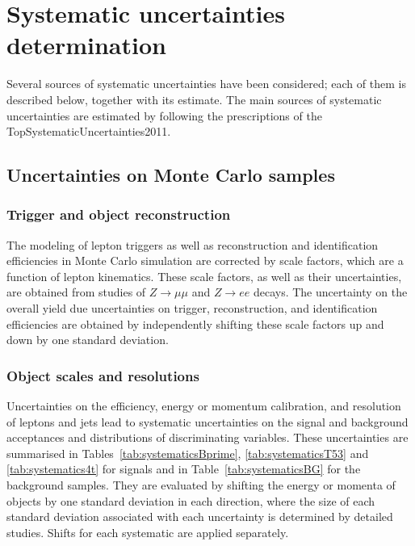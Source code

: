 

\section{Systematic uncertainties determination}  
\label{sec:systematicdetermination}

Several sources of systematic uncertainties have been considered; each of them is described below, together with its estimate. The main sources of systematic uncertainties are estimated
by following the prescriptions of the TopSystematicUncertainties2011.

\subsection{Uncertainties on Monte Carlo samples}

\subsubsection{Trigger and object reconstruction}
The modeling of lepton triggers as well as reconstruction and identification efficiencies in
Monte Carlo simulation are corrected by scale factors, which are a function of lepton kinematics.
These scale factors, as well as their uncertainties, are obtained from studies of $Z \rightarrow \mu \mu$ and $Z \rightarrow e e$ decays.
The uncertainty on the overall yield due uncertainties on trigger, reconstruction, and identification efficiencies 
are obtained by independently shifting these scale factors up and down by one standard deviation.

\subsubsection{Object scales and resolutions}
Uncertainties on the efficiency, energy or momentum calibration, and resolution of leptons and jets 
lead to systematic uncertainties on the signal and background acceptances and distributions of discriminating variables.
These uncertainties are summarised in Tables~\ref{tab:systematicsBprime}, \ref{tab:systematicsT53} and
\ref{tab:systematics4t} for signals and in Table~\ref{tab:systematicsBG} for the background samples.
They are evaluated by shifting the energy or momenta of objects by one standard deviation in each direction, 
where the size of each standard deviation associated with each uncertainty is determined by detailed studies.
Shifts for each systematic are applied separately.

